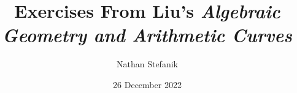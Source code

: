 \title{Exercises From Liu's \textit{Algebraic Geometry and Arithmetic Curves}}
\author{Nathan Stefanik}
\date{26 December 2022}

